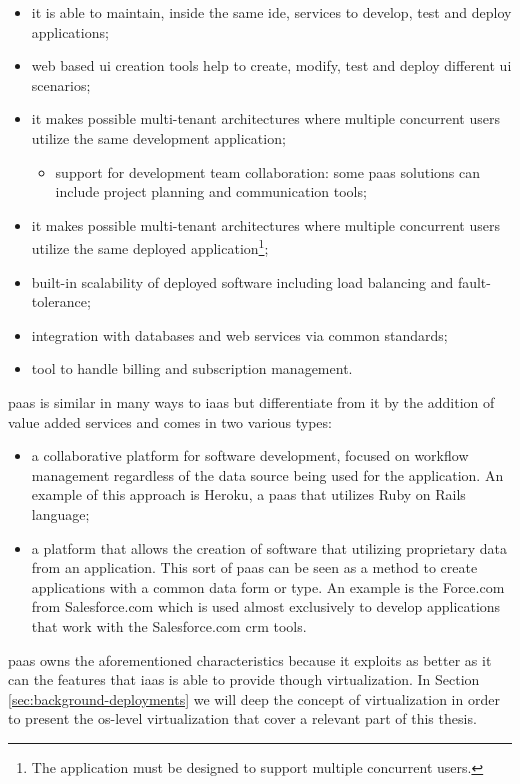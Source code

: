 \begin{itemize}
	\item{it is able to maintain, inside the same \ac{ide}, services to develop, test and deploy
		applications;}
	\item{web based \ac{ui} creation tools help to create, modify, test and deploy different \ac{ui}
		scenarios;}
	\item{it makes possible multi-tenant architectures where multiple concurrent users utilize the same
		development application;}
	\begin{itemize}
		\item{support for development team collaboration: some \ac{paas} solutions can include project
			planning and communication tools;}
	\end{itemize}
	\item{it makes possible multi-tenant architectures where multiple concurrent users utilize the same
		deployed application\footnote{The application must be designed to support multiple concurrent
			users.};}
	\item{built-in scalability of deployed software including load balancing and fault-tolerance;}
	\item{integration with databases and web services via common standards;}
	\item{tool to handle billing and subscription management.}
\end{itemize}

\ac{paas} is similar in many ways to \ac{iaas} but differentiate from it by the addition of value added
services and comes in two various types:

\begin{itemize}
	\item{a collaborative platform for software development, focused on workflow management regardless
		of the data source being used for the application. An example of this approach is Heroku, a
		\ac{paas} that utilizes Ruby on Rails language;}
	\item{a platform that allows the creation of software that utilizing proprietary data from an
		application. This sort of \ac{paas} can be seen as a method to create applications with a common
		data form or type. An example is the Force.com from Salesforce.com which is used almost exclusively
		to develop applications that work with the Salesforce.com \ac{crm} tools.}
\end{itemize}

\ac{paas} owns the aforementioned characteristics because it exploits as better as it can the features 
that \ac{iaas} is able to provide though virtualization. In Section \ref{sec:background-deployments}
we will deep the concept of virtualization in order to present the \acs{os}-level virtualization
that cover a relevant part of this thesis.

